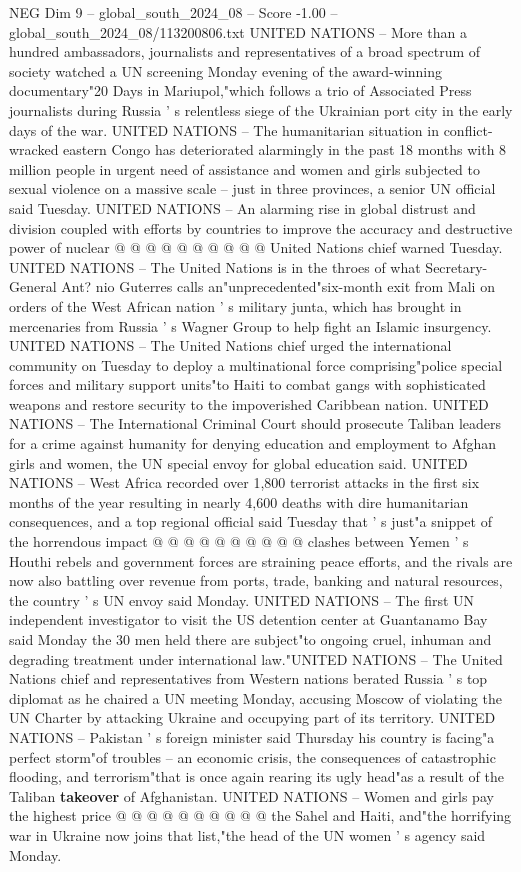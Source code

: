 \begin{textsample}{NEG Dim 9 – global\_south\_2024\_08 – Score -1.00 – global\_south\_2024\_08/113200806.txt}
UNITED NATIONS -- More than a hundred ambassadors, journalists and representatives of a broad spectrum of society watched a UN screening Monday evening of the award-winning documentary"20 Days in Mariupol,"which follows a trio of Associated Press journalists during Russia ' s relentless siege of the Ukrainian port city in the early days of the war.
UNITED NATIONS -- The humanitarian situation in conflict-wracked eastern Congo has deteriorated alarmingly in the past 18 months with 8 million people in urgent need of assistance and women and girls subjected to sexual violence on a massive scale -- just in three provinces, a senior UN official said Tuesday.
UNITED NATIONS -- An alarming rise in global distrust and division coupled with efforts by countries to improve the accuracy and destructive power of nuclear @ @ @ @ @ @ @ @ @ @ United Nations chief warned Tuesday.
UNITED NATIONS -- The United Nations is in the throes of what Secretary-General Ant? nio Guterres calls an"unprecedented"six-month exit from Mali on orders of the West African nation ' s military junta, which has brought in mercenaries from Russia ' s Wagner Group to help fight an Islamic insurgency.
UNITED NATIONS -- The United Nations chief urged the international community on Tuesday to deploy a multinational force comprising"police special forces and military support units"to Haiti to combat gangs with sophisticated weapons and restore security to the impoverished Caribbean nation.
UNITED NATIONS -- The International Criminal Court should prosecute Taliban leaders for a crime against humanity for denying education and employment to Afghan girls and women, the UN special envoy for global education said.
UNITED NATIONS -- West Africa recorded over 1,800 terrorist attacks in the first six months of the year resulting in nearly 4,600 deaths with dire humanitarian consequences, and a top regional official said Tuesday that ' s just"a snippet of the horrendous impact @ @ @ @ @ @ @ @ @ @ clashes between Yemen ' s Houthi rebels and government forces are straining peace efforts, and the rivals are now also battling over revenue from ports, trade, banking and natural resources, the country ' s UN envoy said Monday.
UNITED NATIONS -- The first UN independent investigator to visit the US detention center at Guantanamo Bay said Monday the 30 men held there are subject"to ongoing cruel, inhuman and degrading treatment under international law."UNITED NATIONS -- The United Nations chief and representatives from Western nations berated Russia ' s top diplomat as he chaired a UN meeting Monday, accusing Moscow of violating the UN Charter by attacking Ukraine and occupying part of its territory.
UNITED NATIONS -- Pakistan ' s foreign minister said Thursday his country is facing"a perfect storm"of troubles -- an economic crisis, the consequences of catastrophic flooding, and terrorism"that is once again rearing its ugly head"as a result of the Taliban \textbf{takeover} of Afghanistan.
UNITED NATIONS -- Women and girls pay the highest price @ @ @ @ @ @ @ @ @ @ the Sahel and Haiti, and"the horrifying war in Ukraine now joins that list,"the head of the UN women ' s agency said Monday.

\end{textsample}
